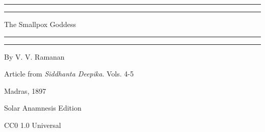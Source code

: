 \documentclass[a4paper, 12pt, oneside, english]{article}
\begin{document}
\begin{titlepage} %
	\centering %
	\scshape %

	
	\rule{\textwidth}{1.6pt}\vspace*{-\baselineskip}\vspace*{2pt} %
	\rule{\textwidth}{0.4pt} %
	
	\vspace{0.75\baselineskip} %
	
	{\Huge The Smallpox Goddess} %
	
	\vspace{0.75\baselineskip} %
	
	\rule{\textwidth}{0.4pt}\vspace*{-\baselineskip}\vspace{3.2pt} %
	\rule{\textwidth}{1.6pt} %
	
	\vspace{1\baselineskip} %
	
		
	\vspace*{1\baselineskip} %
	

        {By \large V. V. Ramanan}
 
	\vspace*{\fill} %

        

	
	

        {Article from \emph{Siddhanta Deepika}. Vols. 4-5}
        
	\vspace*{0.5\baselineskip} %
	
	Madras, 1897 %
	
	\vspace{0.5\baselineskip} %

    {\small Solar Anamnesis Edition} %
	
	{\small CC0 1.0 Universal } %
\end{titlepage}
\setlength{\parskip}{1mm plus1mm minus1mm}
\setcounter{tocdepth}{3}
\setcounter{secnumdepth}{3}
\clearpage
\end{document}
